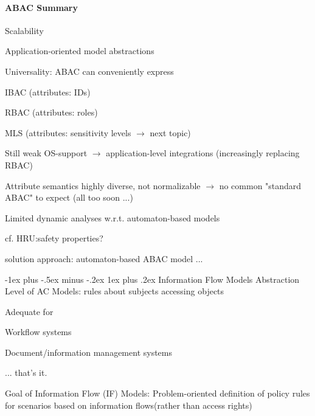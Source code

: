 \documentclass[a4paper]{article}
\makeatletter
\renewcommand{\subsubsection}{\@startsection{subsubsection}{3}{0mm}%
                                {-1ex plus -.5ex minus -.2ex}%
                                {1ex plus .2ex}%
                                {\normalfont\small\bfseries}}
\makeatother
\begin{document}
\begin{multicols}{3}
    \paragraph{ABAC Summary}
    \begin{itemize*}
        \item Scalability
        \item Application-oriented model abstractions
        \item Universality: ABAC can conveniently express
        \begin{itemize*}
            \item IBAC (attributes: IDs)
            \item RBAC (attributes: roles)
            \item MLS (attributes: sensitivity levels $\rightarrow$ next topic)
        \end{itemize*}
        \item Still weak OS-support $\rightarrow$ application-level integrations (increasingly replacing RBAC)
        \item Attribute semantics highly diverse, not normalizable $\rightarrow$ no common "standard ABAC" to expect (all too soon ...)
        \item Limited dynamic analyses w.r.t. automaton-based models
        \begin{itemize*}
            \item cf. HRU:safety properties?
            \item solution approach: automaton-based ABAC model ...
        \end{itemize*}
    \end{itemize*}

    \subsubsection{Information Flow Models}
    Abstraction Level of AC Models: rules about subjects accessing objects

    Adequate for
    \begin{itemize*}
        \item Workflow systems
        \item Document/information management systems
        \item ... that’s it.
    \end{itemize*}

    Goal of Information Flow (IF) Models: Problem-oriented definition of policy rules for scenarios based on information flows(rather than access rights)


\end{multicols}
\end{document}
